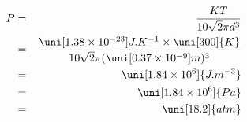 \begin{eqnarray*}
P 
&=&
\frac{KT}{10\sqrt{2} \pi d^3} 
\\ &=& 
\frac{\uni[1.38 \times 10^{-23}]{J.K^{-1}} \times \uni[300]{K}}{10\sqrt{2} \pi 
(
\uni[0.37 \times 10^{-9}]{m}
)^{3}
}
\\ &=&
\uni[1.84 \times 10^6]{J.m^{-3}}
\\ &=&
\uni[1.84 \times 10^6]{Pa}
\\ &=&
\uni[18.2]{atm}
\label{}
\end{eqnarray*}
